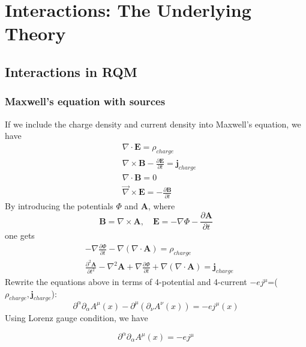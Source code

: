 \chapter{Interactions: The Underlying Theory}
\section{Interactions in RQM}
\subsection{Maxwell's equation with sources}
If we include the charge density and current density into Maxwell's equation, we have
\begin{equation}
\begin{aligned}
&\nabla \cdot \mathbf{E}=\rho_{charge}\\
&\nabla \times \mathbf{B}-\frac{\partial \mathbf{E}}{\partial t}=\mathbf{j}_{charge}\\
&\nabla \cdot \mathbf{B}=0\\
&\vec{\nabla} \times \mathbf{E}=-\frac{\partial \mathbf{B}}{\partial t}
\end{aligned}
\end{equation}
By introducing the potentials $\Phi$ and $\mathbf{A}$, where 
$$
\mathbf{B}=\nabla \times \mathbf{A}, \quad \mathbf{E}=-\nabla \Phi-\frac{\partial \mathbf{A}}{\partial t}
$$
one gets
\begin{equation}
\begin{aligned}
&-\nabla \frac{\partial \Phi}{\partial t}-\nabla(\nabla \cdot \mathbf{A})=\rho_{charge}\\
&\frac{\partial^{2} \mathbf{A}}{\partial t^{2}}-\nabla^{2} \mathbf{A}+\nabla \frac{\partial \Phi}{\partial t}+\nabla(\nabla\cdot\mathbf{A})=\mathbf{j}_{charge}
\end{aligned}
\end{equation}
Rewrite the equations above in terms of 4-potential and 4-current $-ej^{\mu}$=($\rho_{charge},\mathbf{j}_{charge}$):
\begin{equation}
    \partial^{\alpha}\partial_{\alpha}A^{\mu}(x)-\partial^{\mu}\left(\partial_{\nu}A^{\nu}(x)\right)=-ej^{\mu}(x)
\end{equation}
Using Lorenz gauge condition, we have
\begin{qt}
\begin{equation}
    \partial^{\alpha}\partial_{\alpha}A^{\mu}(x)=-ej^{\mu}
    \label{maxwell-4D-interaction-eqn}
\end{equation}
\end{qt}
